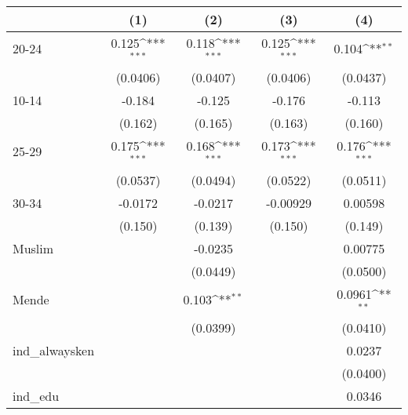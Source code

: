 {
\def\sym#1{\ifmmode^{#1}\else\(^{#1}\)\fi}
\begin{tabular}{l*{4}{c}}
\hline\hline
                    &\multicolumn{1}{c}{(1)}         &\multicolumn{1}{c}{(2)}         &\multicolumn{1}{c}{(3)}         &\multicolumn{1}{c}{(4)}         \\
\hline
20-24               &       0.125\sym{***}&       0.118\sym{***}&       0.125\sym{***}&       0.104\sym{**} \\
                    &    (0.0406)         &    (0.0407)         &    (0.0406)         &    (0.0437)         \\
[1em]
10-14               &      -0.184         &      -0.125         &      -0.176         &      -0.113         \\
                    &     (0.162)         &     (0.165)         &     (0.163)         &     (0.160)         \\
[1em]
25-29               &       0.175\sym{***}&       0.168\sym{***}&       0.173\sym{***}&       0.176\sym{***}\\
                    &    (0.0537)         &    (0.0494)         &    (0.0522)         &    (0.0511)         \\
[1em]
30-34               &     -0.0172         &     -0.0217         &    -0.00929         &     0.00598         \\
                    &     (0.150)         &     (0.139)         &     (0.150)         &     (0.149)         \\
[1em]
Muslim              &                     &     -0.0235         &                     &     0.00775         \\
                    &                     &    (0.0449)         &                     &    (0.0500)         \\
[1em]
Mende               &                     &       0.103\sym{**} &                     &      0.0961\sym{**} \\
                    &                     &    (0.0399)         &                     &    (0.0410)         \\
[1em]
ind\_alwaysken       &                     &                     &                     &      0.0237         \\
                    &                     &                     &                     &    (0.0400)         \\
[1em]
ind\_edu             &                     &                     &                     &      0.0346         \\

\end{tabular}}
